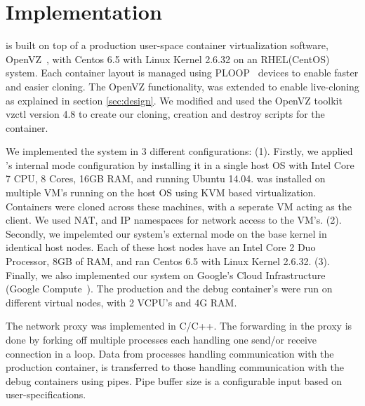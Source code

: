 
\section{Implementation}
\label{sec:implementation}

\noindent
\parikshan is built on top of a production user-space container virtualization software, OpenVZ~\cite{openvz}, with Centos 6.5 with Linux Kernel 2.6.32 on an RHEL(CentOS) system.
Each container layout is managed using PLOOP~\cite{ploop} devices to enable faster and easier cloning.
The OpenVZ functionality, was extended to enable live-cloning as explained in section \ref{sec:design}.
We modified and used the OpenVZ toolkit vzctl version 4.8 to create our cloning, creation and destroy scripts for the container. 

\noindent
We implemented the system in 3 different configurations: 
(1). Firstly, we applied \parikshan 's internal mode configuration by installing it in a single host OS with Intel Core 7 CPU, 8 Cores, 16GB RAM, and running Ubuntu 14.04. 
\parikshan was installed on multiple VM's running on the host OS using KVM based virtualization. 
Containers were cloned across these machines, with a seperate VM acting as the client.
We used NAT, and IP namespaces for network access to the VM's.
(2). Secondly, we impelemted our system's external mode on the base kernel in identical host nodes. 
Each of these host nodes have an Intel Core 2 Duo Processor, 8GB of RAM, and ran Centos 6.5 with Linux Kernel 2.6.32.
(3). Finally, we also implemented our system on Google's Cloud Infrastructure (Google Compute~\cite{gcompute}).
The production and the debug container's were run on different virtual nodes, with 2 VCPU's and 4G RAM. 

The network proxy was implemented in C/C++.
The forwarding in the proxy is done by forking off multiple processes each handling one send/or receive connection in a loop.
Data from processes handling communication with the production container, is  transferred to those handling communication with the debug containers using pipes.
Pipe buffer size is a configurable input based on user-specifications. 